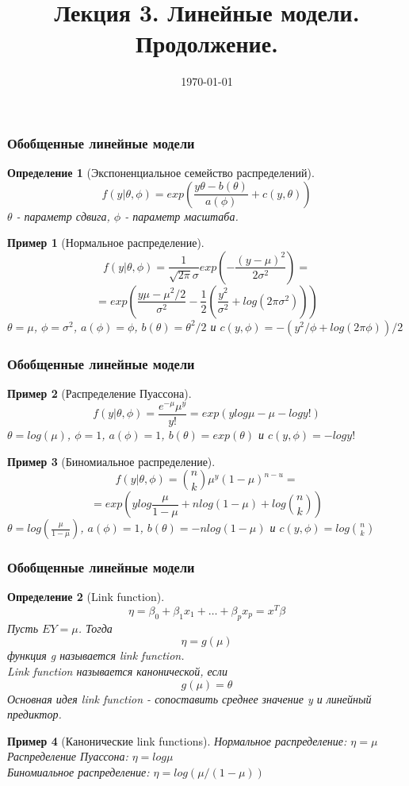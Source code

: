 \documentclass{beamer}
\date{\today}
\newtheorem{defn}{Определение}
\newtheorem{exmp}{Пример}
\begin{document}
\title[\hspace{15em}\insertframenumber/\inserttotalframenumber]{Лекция 3. Линейные модели. Продолжение.}
\begin{frame}
  \titlepage
\end{frame}
 
 
\begin{frame}
\frametitle{Обобщенные линейные модели}
\begin{defn}[Экспоненциальное семейство распределений]
$$f(y|\theta,\phi)=exp\left(\frac{y\theta-b(\theta)}{a(\phi)}+c(y,\theta)\right)$$
$\theta$ - параметр сдвига, $\phi$ - параметр масштаба.
\end{defn}
\begin{exmp}[Нормальное распределение]
$$f(y|\theta,\phi)=\frac{1}{\sqrt{2\pi}\sigma}exp\left(-\frac{(y-\mu)^2}{2\sigma^2}\right)=$$
$$=exp\left(\frac{y\mu-\mu^2/2}{\sigma^2}-\frac{1}{2}\left(\frac{y^2}{\sigma^2	}+log(2\pi\sigma^2)\right)\right)$$
$\theta=\mu$, $\phi=\sigma^2$, $a(\phi)=\phi$, $b(\theta)=\theta^2/2$ и $c(y,\phi)=-(y^2/\phi+log(2\pi\phi))/2$
\end{exmp}
\end{frame}

\begin{frame}
\frametitle{Обобщенные линейные модели}
\begin{exmp}[Распределение Пуассона]
$$f(y|\theta,\phi)=\frac{e^{-\mu}\mu^y}{y!}=exp(ylog{\mu}-\mu-log{y!})$$
$\theta=log(\mu)$, $\phi=1$, $a(\phi)=1$, $b(\theta)=exp(\theta)$ и $c(y,\phi)=-log{y!}$
\end{exmp}
\begin{exmp}[Биномиальное распределение]
$$f(y|\theta,\phi)={n\choose k}\mu^y(1-\mu)^{n-u}=$$
$$=exp(ylog\frac{\mu}{1-\mu}+nlog(1-\mu)+log{n\choose k})$$
$\theta=log(\frac{\mu}{1-\mu})$, $a(\phi)=1$, $b(\theta)=-nlog(1-\mu)$ и $c(y,\phi)=log{n\choose k}$
\end{exmp}
\end{frame}
 
\begin{frame}
\frametitle{Обобщенные линейные модели}
\begin{defn}[Link function]
$$\eta=\beta_0+\beta_1x_1+\ldots+\beta_px_p=x^T\beta$$
Пусть $EY=\mu$. Тогда
$$\eta=g(\mu)$$
функция g называется link function.\\
Link function называется канонической, если
$$g(\mu)=\theta$$
Основная идея link function - сопоставить среднее значение y и линейный предиктор.
\end{defn}
\begin{exmp}[Канонические link functions]
Нормальное распределение: $\eta=\mu$\\
Распределение Пуассона: $\eta=log{\mu}$\\
Биномиальное распределение: $\eta=log(\mu/(1-\mu))$
\end{exmp}


\end{frame}
 
\end{document}
